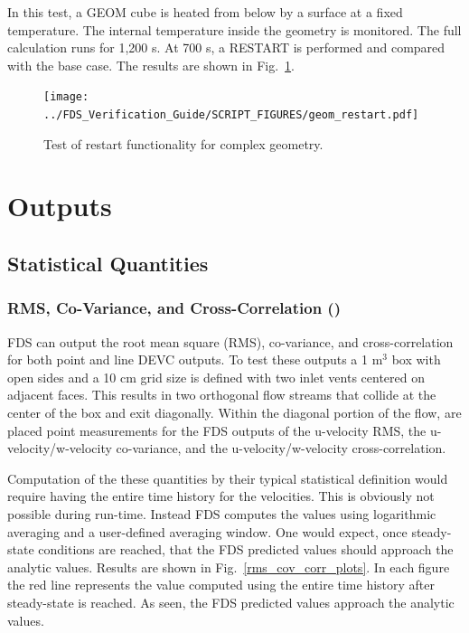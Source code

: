 \documentclass[11pt]{book}
\begin{document}
In this test, a {\ct GEOM} cube is heated from below by a surface at a fixed temperature.  The internal temperature inside the geometry is monitored.  The full calculation runs for 1,200 s.  At 700 s, a {\ct RESTART} is performed and compared with the base case.  The results are shown in Fig.~\ref{fig:geom_restart}.
\begin{figure}[ht]
\centering
\texttt{[image: ../FDS\_Verification\_Guide/SCRIPT\_FIGURES/geom\_restart.pdf]}
\caption[The {\ct geom\_restart} test case]{Test of restart functionality for complex geometry.}
\label{fig:geom_restart}
\end{figure}

\fi


\chapter{Outputs}

\section{Statistical Quantities}

\subsection{RMS, Co-Variance, and Cross-Correlation (\texorpdfstring{}{rms\_cov\_corr})}

FDS can output the root mean square (RMS), co-variance, and cross-correlation for both point and line {\ct DEVC} outputs.  To test these outputs a 1 m$^3$ box with open sides and a 10 cm grid size is defined with two inlet vents centered on adjacent faces.  This results in two orthogonal flow streams that collide at the center of the box and exit diagonally.  Within the diagonal portion of the flow, are placed point measurements for the FDS outputs of the u-velocity RMS, the u-velocity/w-velocity co-variance, and the u-velocity/w-velocity cross-correlation.

Computation of the these quantities by their typical statistical definition would require having the entire time history for the velocities.  This is obviously not possible during run-time.  Instead FDS computes the values using logarithmic averaging and a user-defined averaging window.  One would expect, once steady-state conditions are reached, that the FDS predicted values should approach the analytic values.  Results are shown in Fig.~\ref{rms_cov_corr_plots}.  In each figure the red line represents the value computed using the entire time history after steady-state is reached.  As seen, the FDS predicted values approach the analytic values.
\end{document}

